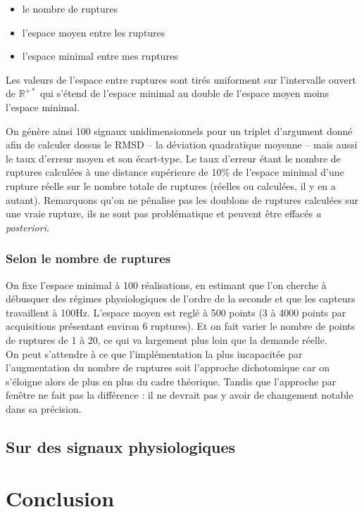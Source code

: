 \documentclass[french,11pt,notitlepage]{report}
\begin{document}
	\begin{itemize}
	\item le nombre de ruptures
	\item l'espace moyen entre les ruptures
	\item l'espace minimal entre mes ruptures\\
	\end{itemize}
	
	Les valeurs de l'espace entre ruptures sont tirés uniforment sur l'intervalle ouvert de $\mathbb R^{+*}$ qui s'étend de l'espace minimal au double de l'espace moyen moins l'espace minimal.
	
	On génère ainsi 100 signaux unidimensionnels pour un triplet d'argument donné afin de calculer dessus le RMSD -- la déviation quadratique moyenne --
	 mais aussi le taux d'erreur moyen et son écart-type.
	Le taux d'erreur étant le nombre de ruptures calculées à une distance supérieure de 10\% de l'espace minimal d'une rupture réelle sur le nombre totale de ruptures (réelles ou calculées, il y en a autant).
	Remarquons qu'on ne pénalise pas les doublons de ruptures calculées sur une vraie rupture, ils ne sont pas problématique et peuvent être effacés \emph{a posteriori}.
	
	
	\subsection{Selon le nombre de ruptures}
	
	
	On fixe l'espace minimal à 100 réalisations, en estimant que l'on cherche à débusquer des régimes physiologiques de l'ordre de la seconde et que les capteurs travaillent à 100Hz.
	L'espace moyen est reglé à 500 points (3 à 4000 points par acquisitions présentant environ 6 ruptures).
	Et on fait varier le nombre de points de ruptures de 1 à 20, ce qui va largement plus loin que la demande réelle.
	\\
	
	On peut s'attendre à ce que l'implémentation la plus incapacitée par l'augmentation du nombre de ruptures soit l'approche dichotomique car on s'éloigne alors de plus en plus du cadre théorique.
	Tandis que l'approche par fenêtre ne fait pas la différence : il ne devrait pas y avoir de changement notable dans sa précision.
	
	
	\section{Sur des signaux physiologiques}
	
	
	
	\chapter{Conclusion}
	
	
	


	
\end{document}
